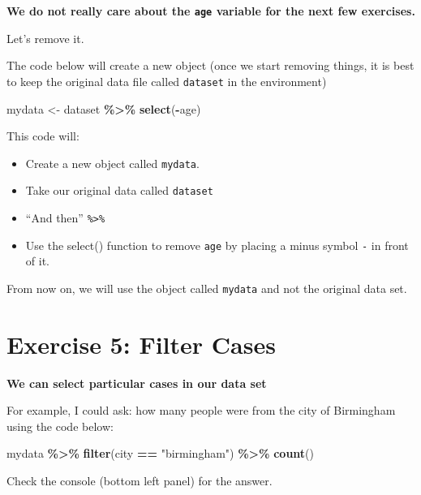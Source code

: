 \documentclass[
]{book}
\newenvironment{Shaded}{\begin{snugshade}}{\end{snugshade}}
\newcommand{\FunctionTok}[1]{\textcolor[rgb]{0.13,0.29,0.53}{\textbf{#1}}}
\newcommand{\NormalTok}[1]{#1}
\newcommand{\OtherTok}[1]{\textcolor[rgb]{0.56,0.35,0.01}{#1}}
\newcommand{\SpecialCharTok}[1]{\textcolor[rgb]{0.81,0.36,0.00}{\textbf{#1}}}
\newcommand{\StringTok}[1]{\textcolor[rgb]{0.31,0.60,0.02}{#1}}
\let\oldsection\section
\renewcommand{\section}{\needspace{5\baselineskip}\oldsection}
\begin{document}
\textbf{We do not really care about the \texttt{age} variable for the next few exercises.}

Let's remove it.

The code below will create a new object (once we start removing things, it is best to keep the original data file called \texttt{dataset} in the environment)

\begin{Shaded}
\begin{Highlighting}[]
\NormalTok{mydata }\OtherTok{\textless{}{-}}\NormalTok{ dataset }\SpecialCharTok{\%\textgreater{}\%}
  \FunctionTok{select}\NormalTok{(}\SpecialCharTok{{-}}\NormalTok{age)}
\end{Highlighting}
\end{Shaded}

This code will:

\begin{itemize}
\item
  Create a new object called \texttt{mydata}.
\item
  Take our original data called \texttt{dataset}
\item
  ``And then'' \texttt{\%\textgreater{}\%}
\item
  Use the select() function to remove \texttt{age} by placing a minus symbol \texttt{-} in front of it.
\end{itemize}

From now on, we will use the object called \texttt{mydata} and not the original data set.

\section{Exercise 5: Filter Cases}\label{exercise-5-filter-cases}

\textbf{We can select particular cases in our data set}

For example, I could ask: how many people were from the city of Birmingham using the code below:

\begin{Shaded}
\begin{Highlighting}[]
\NormalTok{mydata }\SpecialCharTok{\%\textgreater{}\%}
  \FunctionTok{filter}\NormalTok{(city }\SpecialCharTok{==} \StringTok{"birmingham"}\NormalTok{) }\SpecialCharTok{\%\textgreater{}\%}
  \FunctionTok{count}\NormalTok{()}
\end{Highlighting}
\end{Shaded}

Check the console (bottom left panel) for the answer.
\end{document}
